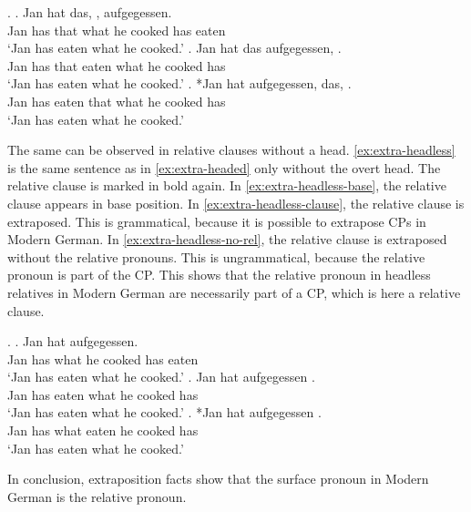 \ex.\label{ex:extra-headed}
\ag. Jan hat das,    , aufgegessen.\\
Jan has that what he cooked has eaten\\
`Jan has eaten what he cooked.'\label{ex:extra-headed-base}
\bg. Jan hat das aufgegessen,    .\\
Jan has that eaten what he cooked has\\
`Jan has eaten what he cooked.'\label{ex:extra-headed-only-clause}
\cg. *Jan hat aufgegessen, das,    .\\
Jan has eaten that what he cooked has\\
`Jan has eaten what he cooked.'\label{ex:extra-headed-head-clause} 

The same can be observed in relative clauses without a head. \ref{ex:extra-headless} is the same sentence as in \ref{ex:extra-headed} only without the overt head. The relative clause is marked in bold again.
In \ref{ex:extra-headless-base}, the relative clause appears in base position. In \ref{ex:extra-headless-clause}, the relative clause is extraposed. This is grammatical, because it is possible to extrapose CPs in Modern German. In \ref{ex:extra-headless-no-rel}, the relative clause is extraposed without the relative pronouns. This is ungrammatical, because the relative pronoun is part of the CP.
This shows that the relative pronoun in headless relatives in Modern German are necessarily part of a CP, which is here a relative clause.

\ex.\label{ex:extra-headless}
\ag. Jan hat     aufgegessen.\\
Jan has what he cooked has eaten\\
`Jan has eaten what he cooked.'\label{ex:extra-headless-base}
\bg. Jan hat aufgegessen    .\\
Jan has eaten what he cooked has\\
`Jan has eaten what he cooked.'\label{ex:extra-headless-clause}
\bg. *Jan hat  aufgegessen   .\\
Jan has what eaten he cooked has\\
`Jan has eaten what he cooked.'\label{ex:extra-headless-no-rel}

In conclusion, extraposition facts show that the surface pronoun in Modern German is the relative pronoun.


